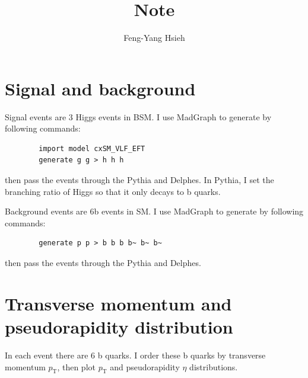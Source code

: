 \documentclass[12pt]{article}
\title{Note}
\author{Feng-Yang Hsieh}
\date{}
\begin{document}
\maketitle
\section{Signal and background}%
\label{sec:signal_and_background}
	Signal events are 3 Higgs events in BSM. I use MadGraph to generate by following commands:
	\begin{verbatim}
		import model cxSM_VLF_EFT
		generate g g > h h h
	\end{verbatim}
	then pass the events through the Pythia and Delphes. In Pythia, I set the branching ratio of Higgs so that it only decays to b quarks.

	Background events are 6b events in SM. I use MadGraph to generate by following commands:
	\begin{verbatim}
		generate p p > b b b b~ b~ b~
	\end{verbatim}
	then pass the events through the Pythia and Delphes.

\section{Transverse momentum and pseudorapidity distribution}%
\label{sec:transverse_momentum_and_pseudorapidity_distribution}
	In each event there are 6 b quarks. I order these b quarks by transverse momentum $p_\text{T}$, then plot $p_\text{T} $ and pseudorapidity $\eta$ distributions.
\end{document}
